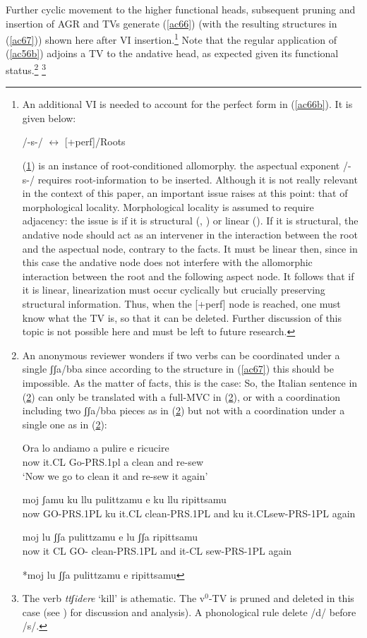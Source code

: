 \documentclass[output=paper]{langscibook}
\begin{document}
Further cyclic movement to the higher functional heads, subsequent pruning and insertion of AGR and TVs generate (\ref{ac66}) (with the resulting structures in (\ref{ac67})) shown here after VI insertion.\footnote{An additional VI is needed to account for the perfect form in (\ref{ac66b}).  It is given below:

\ea \label{fn29ex} /-s-/ $\longleftrightarrow$ [+perf]/Roots \underline{\hspace{2em}}
\z

(\ref{fn29ex}) is an instance of root-conditioned allomorphy. the aspectual exponent /-s-/ requires root-information to be inserted. Although it is not really relevant in the context of this paper, an important issue raises at this point: that of morphological locality.  Morphological locality is assumed to require adjacency: the issue is if it is structural (\cite{bobaljik2012a}, \cite{calabrese2019a}) or linear (\cite{embick2010a}).  If it is structural, the andative node should act as an intervener in the interaction between the root and the aspectual node, contrary to the facts. It must be linear then, since in this case the andative node does not interfere with the allomorphic interaction between the root and the following aspect node. It follows that if it is linear, linearization must occur cyclically but crucially preserving structural information. Thus, when the [+perf] node is reached, one must know what the TV is, so that it can be deleted. Further discussion of this topic is not possible here and must be left to future research.} Note that the regular application of (\ref{ac56b}) adjoins a TV to the andative head, as expected given its functional status.\footnote{ An anonymous reviewer wonders if two verbs can be coordinated under a single ʃʃa/bba since according to the structure in (\ref{ac67}) this should be impossible. As the matter of facts, this is the case: So, the Italian sentence in (\ref{fn30exa}) can only be translated with a full-MVC in (\ref{fn30exb}), or with a coordination including two ʃʃa/bba pieces as in (\ref{fn30exc}) but not with a coordination under a single one as in (\ref{fn30exd}):

\ea \label{fn30exa}\gll Ora lo andiamo a pulire e ricucire \\
 now it.CL Go-PRS.1pl a clean and re-sew\\
\glt ‘Now we go to clean it and re-sew it again’
\z

\ea \label{fn30exb}\gll moj  ʃamu      ku llu    pulittzamu     e   ku llu ripittsamu\\
now GO-PRS.1PL ku  it.CL clean-PRS.1PL and ku it.CLsew-PRS-1PL again\\
\z

\ea \label{fn30exc} \gll moj lu   ʃʃa  pulittzamu    e    lu  ʃʃa ripittsamu\\
 now it CL  GO- clean-PRS.1PL and it-CL sew-PRS-1PL again\\
\z

\ea \label{fn30exd}*moj lu ʃʃa pulittzamu e  ripittsamu
\z
}
\footnote{The verb \textit{ttʃidere} ‘kill’ is athematic. The v$^0$-TV is pruned and deleted in this case (see \cite{calabrese2015a, calabrese2019a}) for discussion and analysis).  A phonological rule delete /d/ before /s/.
}
\end{document}
